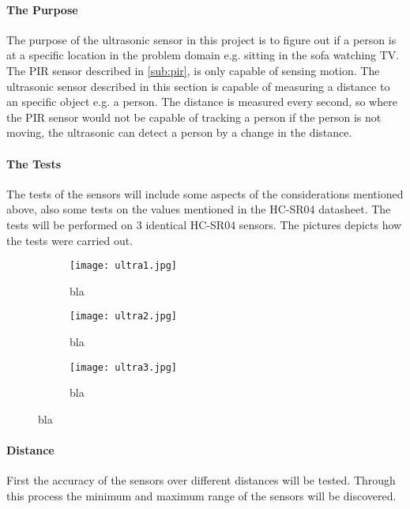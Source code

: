 \paragraph{The Purpose}
The purpose of the ultrasonic sensor in this project is to figure out if a person is at a specific location in the problem domain e.g. sitting in the sofa watching TV. The PIR sensor described in \cref{sub:pir}, is only capable of sensing motion. The ultrasonic sensor described in this section is capable of measuring a distance to an specific object e.g. a person. The distance is measured every second, so where the PIR sensor would not be capable of tracking a person if the person is not moving, the ultrasonic can detect a person by a change in the distance.

\paragraph{The Tests} The tests of the sensors will include some aspects of the considerations mentioned above, also some tests on the values mentioned in the HC-SR04 datasheet\cite{hcsr04}. The tests will be performed on 3 identical HC-SR04 sensors. The pictures  depicts how the tests were carried out.

\begin{figure}[htbp]
  \centering
  \begin{subfigure}{.3\textwidth}
    \centering
    \texttt{[image: ultra1.jpg]}
    \caption{bla}
    \label{fig:ultra1}
  \end{subfigure}
  \begin{subfigure}{.3\textwidth}
    \centering
    \texttt{[image: ultra2.jpg]}
    \caption{bla}
    \label{fig:ultra2}
  \end{subfigure}
  \begin{subfigure}{.3\textwidth}
    \centering
    \texttt{[image: ultra3.jpg]}
    \caption{bla}
    \label{fig:ultra3}
  \end{subfigure}
\end{figure}
  
\paragraph{Distance}
First the accuracy of the sensors over different distances will be tested. Through this process the minimum and maximum range of the sensors will be discovered. 

